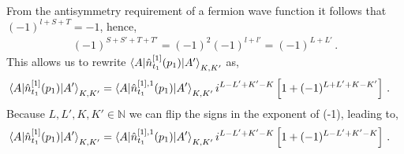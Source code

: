 \documentclass[10pt]{article}
\begin{document}
From the antisymmetry requirement of a fermion wave function it follows that 
$(-1)^{l+S+T}=-1$, hence,
\begin{align}
	(-1)^{S+S'+T+T'} = (-1)^{2}(-1)^{l+l'} = (-1)^{L+L'} \, .
	\label{eq:antisymm_phase_id}
\end{align}
This allows us to rewrite $\braket{ A | \hat{n}_{t_1}^{[1]}(p_1) | A'}_{K,K'}$ 
as,
\begin{align*}
	\braket{ A | \hat{n}_{t_1}^{[1]}(p_1) | A'}_{K,K'} &= \braket{ A | 
\hat{n}_{t_1}^{[1],1}(p_1) | A'}_{K,K'} i^{L-L' + K'-K} \left[ 1 + 
(-1)^{L+L'+K-K'} \right] \, .
\end{align*}
Because $L,L',K,K' \in \mathbb{N}$ we can flip the signs in the exponent of 
(-1), leading to,
\begin{align}
	\braket{ A | \hat{n}_{t_1}^{[1]}(p_1) | A'}_{K,K'} &= \braket{ A | 
\hat{n}_{t_1}^{[1],1}(p_1) | A'}_{K,K'} i^{L-L' + K'-K} \left[ 1 + 
(-1)^{L-L'+K'-K} \right] \, .
\end{align}
\end{document}
